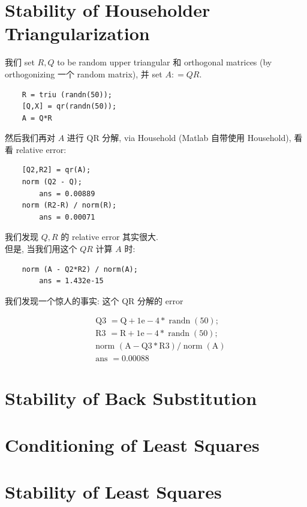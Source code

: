 \documentclass[lang=cn,11pt]{elegantbook}
\begin{document}
\section{Stability of Householder Triangularization}
我们 set $R, Q$ to be random upper triangular 和 orthogonal matrices (by orthogonizing 一个 random matrix), 并 set $A : = QR$.
\begin{verbatim}
    R = triu (randn(50));
    [Q,X] = qr(randn(50));
    A = Q*R
\end{verbatim}
然后我们再对 $A$ 进行 QR 分解, via Household (Matlab 自带使用 Household), 看看 relative error: 
\begin{verbatim}
    [Q2,R2] = qr(A);
    norm (Q2 - Q);
        ans = 0.00889
    norm (R2-R) / norm(R);
        ans = 0.00071
\end{verbatim}
我们发现 $Q,R$ 的 relative error 其实很大.\\
但是, 当我们用这个 $QR$ 计算 $A$ 时:
\begin{verbatim}
    norm (A - Q2*R2) / norm(A);
        ans = 1.432e-15
\end{verbatim}
我们发现一个惊人的事实: 这个 QR 分解的 error 


$$
\begin{aligned}
& \text { Q3 }=\mathrm{Q}+1 \mathrm{e}-4 * \operatorname{randn}(50) ; \\
& \text { R3 }=\mathrm{R}+1 \mathrm{e}-4 * \operatorname{randn}(50) ; \\
& \text { norm }(\mathrm{A}-\mathrm{Q} 3 * \mathrm{R} 3) / \operatorname{norm}(\mathrm{A}) \\
& \text { ans }=0.00088
\end{aligned}
$$







\section{Stability of Back Substitution}








\section{Conditioning of Least Squares}







\section{Stability of Least Squares}




















\printbibliography
\appendix
\end{document}
